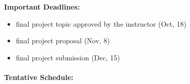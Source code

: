\documentclass[12pt]{article}
\begin{document}
\vspace*{.15in}

\noindent\textbf{Important Deadlines:} 

\begin{itemize}
  \item final project topic approved by the instructor (Oct, 18)
  \item final project proposal (Nov, 8)
  \item final project submission (Dec, 15) 
\end{itemize}

\clearpage
\paragraph*{Tentative Schedule:}
\end{document}

